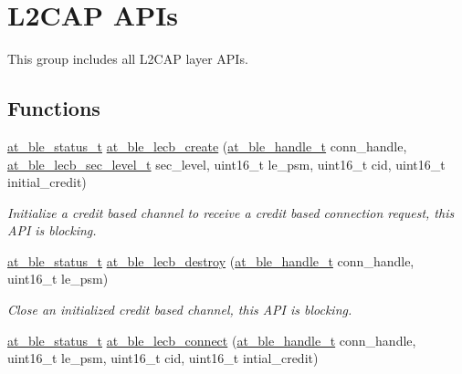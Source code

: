 \hypertarget{group__l2cap__group}{}\section{L2\+C\+AP A\+P\+Is}
\label{group__l2cap__group}


This group includes all L2\+C\+AP layer A\+P\+Is.  


\subsection*{Functions}
\begin{DoxyCompactItemize}
\item 
\mbox{\hyperlink{group__error__codes__group_ga3b1db9b95feb157b3c188ca27fe76988}{at\+\_\+ble\+\_\+status\+\_\+t}} \mbox{\hyperlink{group__l2cap__group_ga18f4585bcee377813ff43ecd91018039}{at\+\_\+ble\+\_\+lecb\+\_\+create}} (\mbox{\hyperlink{at__ble__api_8h_abd23646d0c662860741f787efc8456f2}{at\+\_\+ble\+\_\+handle\+\_\+t}} conn\+\_\+handle, \mbox{\hyperlink{at__ble__api_8h_aa1a90dfd6d45ff1a1948ea7b02821558}{at\+\_\+ble\+\_\+lecb\+\_\+sec\+\_\+level\+\_\+t}} sec\+\_\+level, uint16\+\_\+t le\+\_\+psm, uint16\+\_\+t cid, uint16\+\_\+t initial\+\_\+credit)
\begin{DoxyCompactList}\small\item\em Initialize a credit based channel to receive a credit based connection request, this A\+PI is blocking. \end{DoxyCompactList}\item 
\mbox{\hyperlink{group__error__codes__group_ga3b1db9b95feb157b3c188ca27fe76988}{at\+\_\+ble\+\_\+status\+\_\+t}} \mbox{\hyperlink{group__l2cap__group_ga0cc998a2bb26b0dbee0f911969762299}{at\+\_\+ble\+\_\+lecb\+\_\+destroy}} (\mbox{\hyperlink{at__ble__api_8h_abd23646d0c662860741f787efc8456f2}{at\+\_\+ble\+\_\+handle\+\_\+t}} conn\+\_\+handle, uint16\+\_\+t le\+\_\+psm)
\begin{DoxyCompactList}\small\item\em Close an initialized credit based channel, this A\+PI is blocking. \end{DoxyCompactList}\item 
\mbox{\hyperlink{group__error__codes__group_ga3b1db9b95feb157b3c188ca27fe76988}{at\+\_\+ble\+\_\+status\+\_\+t}} \mbox{\hyperlink{group__l2cap__group_ga6ad32497a93633da95781e9e2000877b}{at\+\_\+ble\+\_\+lecb\+\_\+connect}} (\mbox{\hyperlink{at__ble__api_8h_abd23646d0c662860741f787efc8456f2}{at\+\_\+ble\+\_\+handle\+\_\+t}} conn\+\_\+handle, uint16\+\_\+t le\+\_\+psm, uint16\+\_\+t cid, uint16\+\_\+t intial\+\_\+credit)

\end{DoxyCompactItemize}
